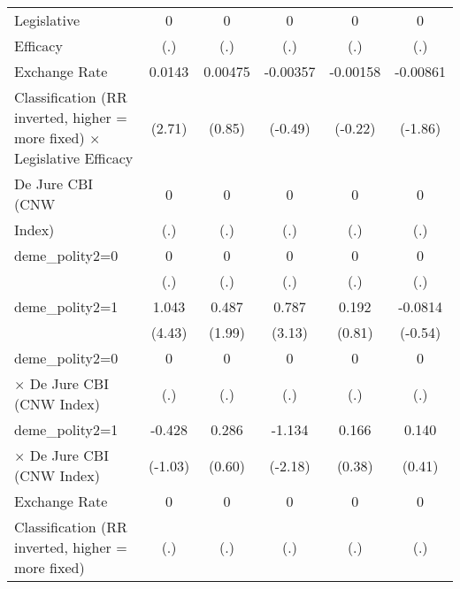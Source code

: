 {\begin{tabular}{l*{5}{c}}
Legislative     &        0         &        0         &        0         &        0         &        0         \\
Efficacy        &      (.)         &      (.)         &      (.)         &      (.)         &      (.)         \\
\addlinespace
Exchange Rate   &   0.0143\sym{**} &  0.00475         & -0.00357         & -0.00158         & -0.00861         \\
Classification (RR inverted, higher = more fixed) $\times$ Legislative Efficacy&   (2.71)         &   (0.85)         &  (-0.49)         &  (-0.22)         &  (-1.86)         \\
\addlinespace
De Jure CBI (CNW&        0         &        0         &        0         &        0         &        0         \\
Index)          &      (.)         &      (.)         &      (.)         &      (.)         &      (.)         \\
\addlinespace
deme\_polity2=0  &        0         &        0         &        0         &        0         &        0         \\
                &      (.)         &      (.)         &      (.)         &      (.)         &      (.)         \\
\addlinespace
deme\_polity2=1  &    1.043\sym{***}&    0.487\sym{*}  &    0.787\sym{**} &    0.192         &  -0.0814         \\
                &   (4.43)         &   (1.99)         &   (3.13)         &   (0.81)         &  (-0.54)         \\
\addlinespace
deme\_polity2=0  &        0         &        0         &        0         &        0         &        0         \\
$\times$ De Jure CBI (CNW Index)&      (.)         &      (.)         &      (.)         &      (.)         &      (.)         \\
\addlinespace
deme\_polity2=1  &   -0.428         &    0.286         &   -1.134\sym{*}  &    0.166         &    0.140         \\
$\times$ De Jure CBI (CNW Index)&  (-1.03)         &   (0.60)         &  (-2.18)         &   (0.38)         &   (0.41)         \\
\addlinespace
Exchange Rate   &        0         &        0         &        0         &        0         &        0         \\
Classification (RR inverted, higher = more fixed)&      (.)         &      (.)         &      (.)         &      (.)         &      (.)         \\

\end{tabular}}
